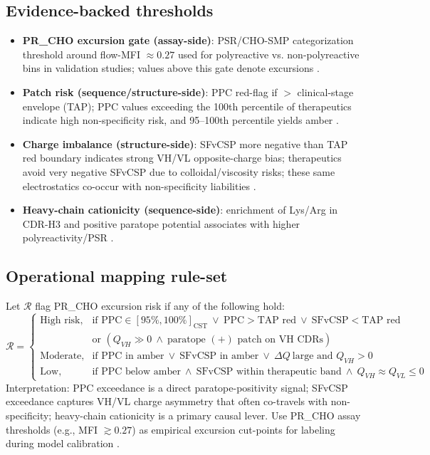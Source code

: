 \subsection*{Evidence-backed thresholds}
\begin{itemize}\setlength\itemsep{2pt}
\item \textbf{PR\_CHO excursion gate (assay-side)}: PSR/CHO-SMP categorization threshold around flow-MFI $\approx 0.27$ used for polyreactive vs. non-polyreactive bins in validation studies; values above this gate denote excursions \cite{makowski_thesis}.
\item \textbf{Patch risk (sequence/structure-side)}: PPC red-flag if $>$ clinical-stage envelope (TAP); PPC values exceeding the 100th percentile of therapeutics indicate high non-specificity risk, and 95–100th percentile yields amber \cite{tap_site, raybould_ctx2024}.
\item \textbf{Charge imbalance (structure-side)}: SFvCSP more negative than TAP red boundary indicates strong VH/VL opposite-charge bias; therapeutics avoid very negative SFvCSP due to colloidal/viscosity risks; these same electrostatics co-occur with non-specificity liabilities \cite{raybould_pnas2019, deane_qsar}.
\item \textbf{Heavy-chain cationicity (sequence-side)}: enrichment of Lys/Arg in CDR-H3 and positive paratope potential associates with higher polyreactivity/PSR \cite{chen_cellrep2024, lecerf_polyreact2023}.
\end{itemize}

\subsection*{Operational mapping rule-set}
Let $\mathcal{R}$ flag PR\_CHO excursion risk if any of the following hold:
\[
\mathcal{R} = 
\begin{cases}
\text{High risk}, & \text{if } \text{PPC}\in[95\%,100\%]_{\text{CST}}\ \lor\ \text{PPC}>\text{TAP red}\ \lor\ \text{SFvCSP}<\text{TAP red} \\
& \text{or } \left(Q_{VH}\gg 0\ \land\ \text{paratope }(+)\text{ patch on VH CDRs}\right) \\
\text{Moderate}, & \text{if } \text{PPC in amber}\ \lor\ \text{SFvCSP in amber}\ \lor\ \Delta Q\ \text{large and }Q_{VH}>0 \\
\text{Low}, & \text{if } \text{PPC below amber}\ \land\ \text{SFvCSP within therapeutic band}\ \land\ Q_{VH}\approx Q_{VL}\le 0
\end{cases}
\]
Interpretation: PPC exceedance is a direct paratope-positivity signal; SFvCSP exceedance captures VH/VL charge asymmetry that often co-travels with non-specificity; heavy-chain cationicity is a primary causal lever. Use PR\_CHO assay thresholds (e.g., MFI $\gtrsim 0.27$) as empirical excursion cut-points for labeling during model calibration \cite{makowski_thesis, tap_site, chen_cellrep2024, raybould_pnas2019}.

